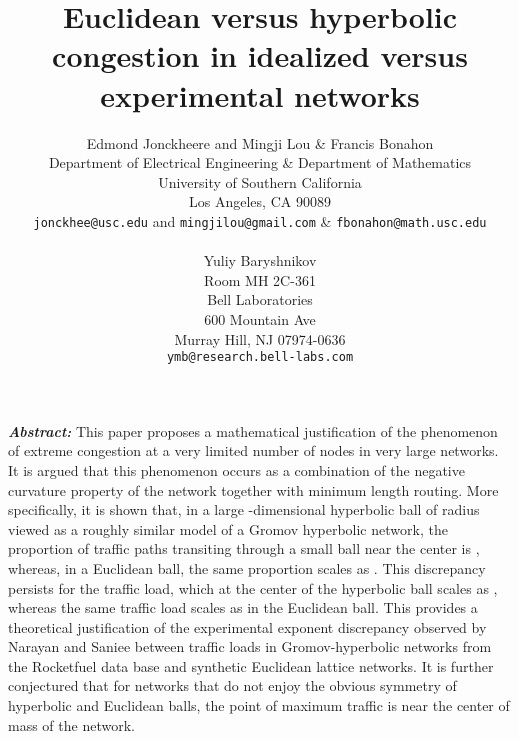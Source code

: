 \documentclass{article}
\begin{document}
\title{Euclidean versus hyperbolic congestion in idealized versus experimental networks}



\author{Edmond Jonckheere and Mingji Lou \& Francis Bonahon \\
Department of Electrical Engineering \& Department of Mathematics\\
University of Southern California \\
Los Angeles, CA 90089\\
{\tt jonckhee@usc.edu} and {\tt mingjilou@gmail.com} \& {\tt fbonahon@math.usc.edu}\\
\\
Yuliy Baryshnikov\\
Room MH 2C-361\\
Bell Laboratories\\
600 Mountain Ave\\
Murray Hill, NJ 07974-0636\\
{\tt ymb@research.bell-labs.com}\\
}
\maketitle
\noindent 

\noindent 

\noindent \textbf{\textit{Abstract: }}This paper proposes a mathematical justification of the phenomenon of extreme congestion at a very limited number of nodes in very large networks. It is argued that this phenomenon occurs as a combination of the negative curvature property of the network together with minimum length routing. More specifically, it is shown that, 
in a large -dimensional hyperbolic ball  of radius  viewed as a roughly similar model of a Gromov hyperbolic network, 
the proportion of traffic paths transiting through a small ball near the center is , 
whereas, in a Euclidean ball, the same proportion scales as . 
This discrepancy persists for the traffic load, 
which at the center of the hyperbolic ball scales as , 
whereas the same traffic load scales as  in the Euclidean ball. 
This provides a theoretical justification of the experimental exponent discrepancy observed by Narayan and Saniee 
between traffic loads in Gromov-hyperbolic networks from the Rocketfuel data base and synthetic Euclidean lattice networks. 
It is further conjectured that for networks that do not enjoy the obvious symmetry of hyperbolic and Euclidean balls, 
the point of maximum traffic is near the center of mass of the network.
\end{document}
